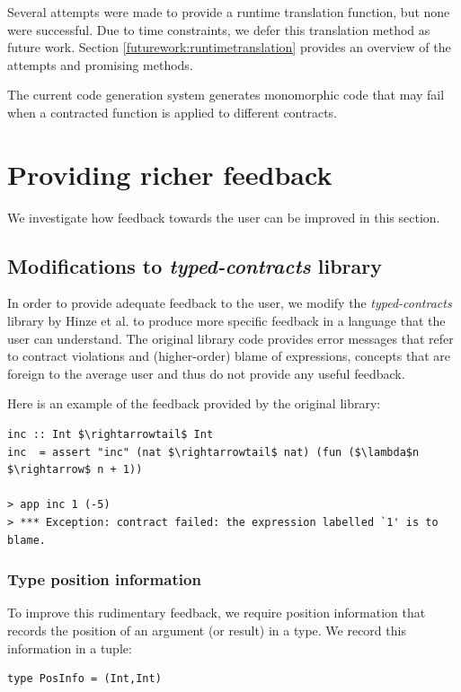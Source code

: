 \documentclass[10pt]{report}
\begin{document}
{Several attempts were made to provide a runtime translation function, but none were successful.
Due to time constraints, we defer this translation method as future work.
Section \ref{futurework:runtimetranslation} provides an overview of the attempts and promising methods.

The current code generation system generates monomorphic code that may fail when a contracted function is applied to different contracts.

\section{Providing richer feedback}

We investigate how feedback towards the user can be improved in this section.

\subsection{Modifications to \textit{typed-contracts} library}
\label{modificationstotypedcontracts}
In order to provide adequate feedback to the user, we modify the \textit{typed-contracts} library by Hinze et al. \cite{Hinze06typedcontracts} to produce more specific feedback in a language that the user can understand.
The original library code provides error messages that refer to contract violations and (higher-order) blame of expressions, concepts that are foreign to the average user and thus do not provide any useful feedback.

Here is an example of the feedback provided by the original library:

\begin{lstlisting}[mathescape]
inc :: Int $\rightarrowtail$ Int
inc  = assert "inc" (nat $\rightarrowtail$ nat) (fun ($\lambda$n $\rightarrow$ n + 1))

> app inc 1 (-5)
> *** Exception: contract failed: the expression labelled `1' is to blame.
\end{lstlisting}

\subsubsection{Type position information}

To improve this rudimentary feedback, we require position information that records the position of an argument (or result) in a type.
We record this information in a tuple:

\begin{lstlisting}
type PosInfo = (Int,Int)
\end{lstlisting}

}
\end{document}
